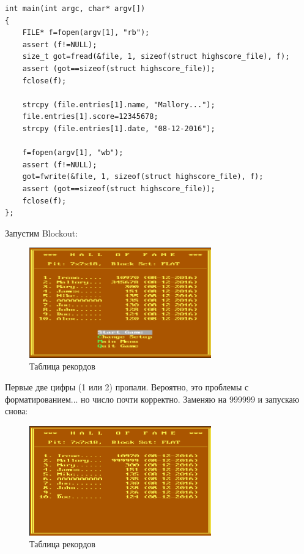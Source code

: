 \begin{lstlisting}[style=customc]
int main(int argc, char* argv[])
{
	FILE* f=fopen(argv[1], "rb");
	assert (f!=NULL);
	size_t got=fread(&file, 1, sizeof(struct highscore_file), f);
	assert (got==sizeof(struct highscore_file));
	fclose(f);

	strcpy (file.entries[1].name, "Mallory...");
	file.entries[1].score=12345678;
	strcpy (file.entries[1].date, "08-12-2016");

	f=fopen(argv[1], "wb");
	assert (f!=NULL);
	got=fwrite(&file, 1, sizeof(struct highscore_file), f);
	assert (got==sizeof(struct highscore_file));
	fclose(f);
};
\end{lstlisting}

Запустим Blockout:

\begin{figure}[H]
\centering
\includegraphics[width=0.7\textwidth]{advanced/550_more_structs/blockout/hs345678.png}
\caption{Таблица рекордов}
\end{figure}

Первые две цифры (1 или 2) пропали. Вероятно, это проблемы с форматированием... но число почти корректно.
Заменяю на 999999 и запускаю снова:

\begin{figure}[H]
\centering
\includegraphics[width=0.7\textwidth]{advanced/550_more_structs/blockout/hs999999.png}
\caption{Таблица рекордов}
\end{figure}

